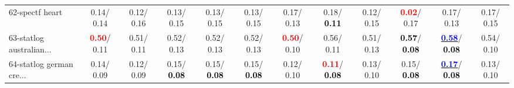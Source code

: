 \begin{table}[h]
\begin{center}
{\begin{tabular}{lc|c|c|c|c|c|c|c|c|c|c}
62-spectf heart &   0.14/  0.14 &   0.12/  0.16 &   0.13/  0.15 &   0.13/  0.15 &   0.13/  0.15 &   0.17/  0.13 &   0.18/\textcolor{black}{\textbf{  0.11}} &   0.12/  0.15 & \textcolor{red}{\textbf{  0.02}}/  0.17 &   0.17/  0.13 &   0.17/  0.15 \\
63-statlog australian... & \textcolor{red}{\textbf{  0.50}}/  0.11 &   0.51/  0.11 &   0.52/  0.13 &   0.52/  0.13 &   0.52/  0.13 & \textcolor{red}{\textbf{  0.50}}/  0.10 &   0.56/  0.11 &   0.51/  0.13 & \textcolor{black}{\textbf{  0.57}}/\textcolor{black}{\textbf{  0.08}} & \underline{\textcolor{blue}{\textbf{  0.58}}}/\textcolor{black}{\textbf{  0.08}} &   0.54/  0.10 \\
64-statlog german cre... &   0.14/  0.09 &   0.12/  0.09 &   0.15/\textcolor{black}{\textbf{  0.08}} &   0.15/\textcolor{black}{\textbf{  0.08}} &   0.15/\textcolor{black}{\textbf{  0.08}} &   0.12/  0.10 & \textcolor{red}{\textbf{  0.11}}/\textcolor{black}{\textbf{  0.08}} &   0.13/  0.10 &   0.15/\textcolor{black}{\textbf{  0.08}} & \underline{\textcolor{blue}{\textbf{  0.17}}}/\textcolor{black}{\textbf{  0.08}} &   0.13/  0.10 \\\end{tabular}}\label{stratsALCKappa1aCIELM}
\end{center}
\end{table}
